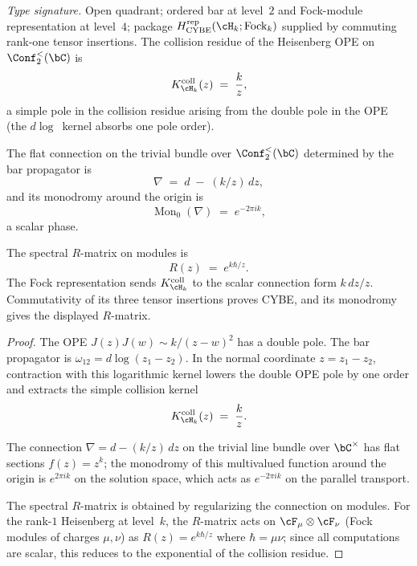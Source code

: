 \begin{theorem}
\label{thm:heisenberg-rmatrix}
\emph{Type signature.} Open quadrant; ordered bar at level~$2$ and
Fock-module representation at level~$4$; package
$H_{\mathrm{CYBE}}^{\mathrm{rep}}(\cH_k;\mathrm{Fock}_k)$ supplied by
commuting rank-one tensor insertions.
The collision residue of the Heisenberg OPE on
$\Conf_2^{<}(\bC)$ is
\begin{equation}\label{eq:heisenberg-collision-residue}
K_{\cH_k}^{\mathrm{coll}}(z)
\;=\;
\frac{k}{z},
\end{equation}
a simple pole in the collision residue arising from the
double pole in the OPE \textup{(}the $d\log$~kernel absorbs
one pole order\textup{)}.

The flat connection on the trivial bundle over
$\Conf_2^{<}(\bC)$ determined by the bar propagator is
\begin{equation}\label{eq:heisenberg-connection}
\nabla \;=\; d \;-\; (k/z)\,dz,
\end{equation}
and its monodromy around the origin is
\begin{equation}\label{eq:heisenberg-monodromy}
\operatorname{Mon}_0(\nabla) \;=\; e^{-2\pi ik},
\end{equation}
a scalar phase.

The spectral $R$-matrix on modules is
\begin{equation}\label{eq:heisenberg-R-matrix}
R(z) \;=\; e^{k\hbar/z}.
\end{equation}
The Fock representation sends $K_{\cH_k}^{\mathrm{coll}}$ to the
scalar connection form $k\,dz/z$.  Commutativity of its three tensor
insertions proves CYBE, and its monodromy gives the displayed
$R$-matrix.
\end{theorem}

\begin{proof}
The OPE $J(z)J(w) \sim k/(z-w)^2$ has a double pole.
The bar propagator is $\omega_{12}=d\log(z_1-z_2)$. In the
normal coordinate $z=z_1-z_2$, contraction with this logarithmic
kernel lowers the double OPE pole by one order and extracts the
simple collision kernel
\[
K_{\cH_k}^{\mathrm{coll}}(z)
\;=\;
\frac{k}{z}.
\]

The connection $\nabla = d - (k/z)\,dz$ on the trivial
line bundle over $\bC^\times$ has flat sections
$f(z) = z^k$; the monodromy of this multivalued
function around the origin is $e^{2\pi ik}$ on the
solution space, which acts as $e^{-2\pi ik}$ on the
parallel transport.

The spectral $R$-matrix is obtained by regularizing the
connection on modules. For the rank-$1$ Heisenberg at
level~$k$, the $R$-matrix acts on $\cF_\mu\otimes\cF_\nu$
(Fock modules of charges $\mu,\nu$) as
$R(z) = e^{k\hbar/z}$ where $\hbar = \mu\nu$; since all
computations are scalar, this reduces to the exponential
of the collision residue.
\end{proof}

